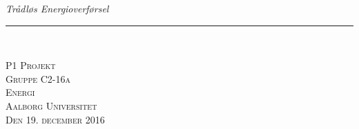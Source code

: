 
\thispagestyle{empty}
\begin{flushright}
\vspace{3cm}

\phantom{hul}

\phantom{hul}

\phantom{hul}

\textsl{\Huge Trådløs Energioverførsel} \\ \vspace{1cm}

\rule{13cm}{3mm} \\ \vspace{1.5cm}
\vspace{1cm}


\vspace{2cm} 
\textsc{\Large P1 Projekt \\
Gruppe C2-16a \\
Energi\\
Aalborg Universitet\\
Den 19. december 2016\\}
\end{flushright}

\newpage
